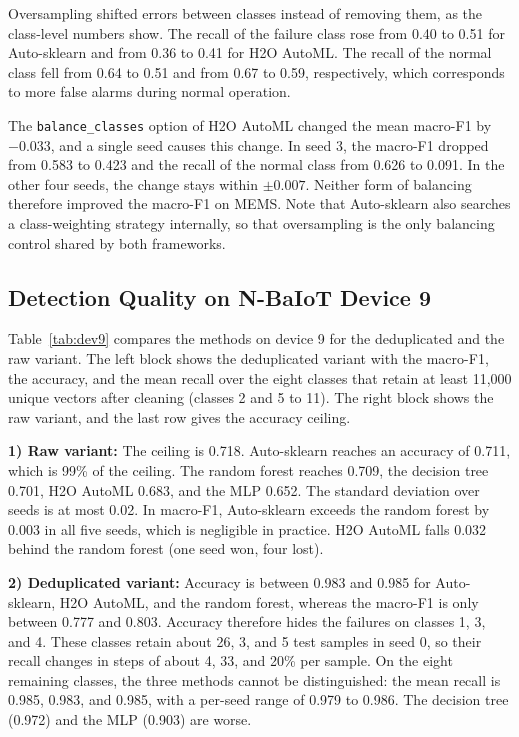 Oversampling shifted errors between classes instead of removing them, as the class-level numbers show. The recall of the failure class rose from 0.40 to 0.51 for Auto-sklearn and from 0.36 to 0.41 for H2O AutoML. The recall of the normal class fell from 0.64 to 0.51 and from 0.67 to 0.59, respectively, which corresponds to more false alarms during normal operation.

The \texttt{balance\_classes} option of H2O AutoML changed the mean macro-F1 by $-0.033$, and a single seed causes this change. In seed 3, the macro-F1 dropped from 0.583 to 0.423 and the recall of the normal class from 0.626 to 0.091. In the other four seeds, the change stays within $\pm0.007$. Neither form of balancing therefore improved the macro-F1 on MEMS. Note that Auto-sklearn also searches a class-weighting strategy internally, so that oversampling is the only balancing control shared by both frameworks.

\subsection{Detection Quality on N-BaIoT Device 9}
Table~\ref{tab:dev9} compares the methods on device 9 for the deduplicated and the raw variant. The left block shows the deduplicated variant with the macro-F1, the accuracy, and the mean recall over the eight classes that retain at least 11,000 unique vectors after cleaning (classes 2 and 5 to 11). The right block shows the raw variant, and the last row gives the accuracy ceiling.

\textbf{1) Raw variant:} The ceiling is 0.718. Auto-sklearn reaches an accuracy of 0.711, which is 99\% of the ceiling. The random forest reaches 0.709, the decision tree 0.701, H2O AutoML 0.683, and the MLP 0.652. The standard deviation over seeds is at most 0.02. In macro-F1, Auto-sklearn exceeds the random forest by 0.003 in all five seeds, which is negligible in practice. H2O AutoML falls 0.032 behind the random forest (one seed won, four lost).

\textbf{2) Deduplicated variant:} Accuracy is between 0.983 and 0.985 for Auto-sklearn, H2O AutoML, and the random forest, whereas the macro-F1 is only between 0.777 and 0.803. Accuracy therefore hides the failures on classes 1, 3, and 4. These classes retain about 26, 3, and 5 test samples in seed 0, so their recall changes in steps of about 4, 33, and 20\% per sample. On the eight remaining classes, the three methods cannot be distinguished: the mean recall is 0.985, 0.983, and 0.985, with a per-seed range of 0.979 to 0.986. The decision tree (0.972) and the MLP (0.903) are worse.

